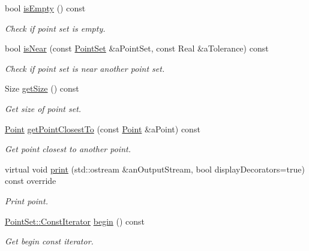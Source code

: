 \begin{DoxyCompactItemize}
bool \hyperlink{classostk_1_1math_1_1geom_1_1d3_1_1objects_1_1_point_set_a107e4bdbcee1586d393d804428889049}{is\+Empty} () const
\begin{DoxyCompactList}\small\item\em Check if point set is empty. \end{DoxyCompactList}\item 
bool \hyperlink{classostk_1_1math_1_1geom_1_1d3_1_1objects_1_1_point_set_a5ee3cc0360a12ff12dc960f6a09aacc2}{is\+Near} (const \hyperlink{classostk_1_1math_1_1geom_1_1d3_1_1objects_1_1_point_set}{Point\+Set} \&a\+Point\+Set, const Real \&a\+Tolerance) const
\begin{DoxyCompactList}\small\item\em Check if point set is near another point set. \end{DoxyCompactList}\item 
Size \hyperlink{classostk_1_1math_1_1geom_1_1d3_1_1objects_1_1_point_set_a8c773ea027260feeb3b24298d075f228}{get\+Size} () const
\begin{DoxyCompactList}\small\item\em Get size of point set. \end{DoxyCompactList}\item 
\hyperlink{classostk_1_1math_1_1geom_1_1d3_1_1objects_1_1_point}{Point} \hyperlink{classostk_1_1math_1_1geom_1_1d3_1_1objects_1_1_point_set_a55f63833c4c6fe3481a4f8833701907a}{get\+Point\+Closest\+To} (const \hyperlink{classostk_1_1math_1_1geom_1_1d3_1_1objects_1_1_point}{Point} \&a\+Point) const
\begin{DoxyCompactList}\small\item\em Get point closest to another point. \end{DoxyCompactList}\item 
virtual void \hyperlink{classostk_1_1math_1_1geom_1_1d3_1_1objects_1_1_point_set_adeeac2042e2e518b51c3b8dc4365c130}{print} (std\+::ostream \&an\+Output\+Stream, bool display\+Decorators=true) const override
\begin{DoxyCompactList}\small\item\em Print point. \end{DoxyCompactList}\item 
\hyperlink{classostk_1_1math_1_1geom_1_1d3_1_1objects_1_1_point_set_aa87eb9a571cb8b420e8c404005a2b723}{Point\+Set\+::\+Const\+Iterator} \hyperlink{classostk_1_1math_1_1geom_1_1d3_1_1objects_1_1_point_set_ab660f9c1ab7ec392dce305a0d6cf72a5}{begin} () const
\begin{DoxyCompactList}\small\item\em Get begin const iterator. \end{DoxyCompactList}\item 

\end{DoxyCompactItemize}
